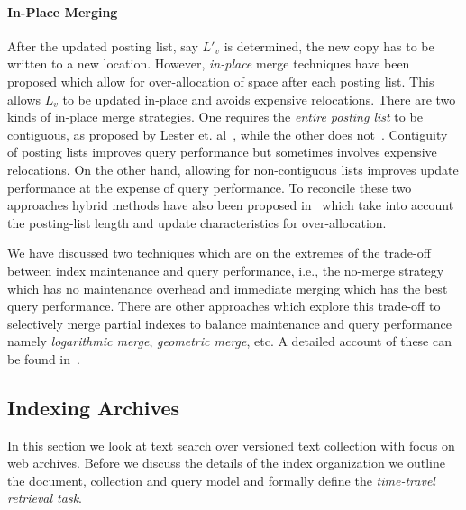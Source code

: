 \paragraph{In-Place Merging}
After the updated posting list, say $L'_v$ is determined, the new copy has to be written to a new location. However, \emph{in-place} merge techniques have been proposed which allow for over-allocation of space after each posting list. This allows $L_v$ to be updated in-place and avoids expensive relocations. There are two kinds of in-place merge strategies. One requires the \emph{entire posting list} to be contiguous, as proposed by Lester et. al~\cite{lester2006efficient}, while the other does not~\cite{tomasic1994incremental}. Contiguity of posting lists improves query performance but sometimes involves expensive relocations. On the other hand, allowing for non-contiguous lists improves update performance at the expense of query performance. To reconcile these two approaches hybrid methods have also been proposed in~\cite{buttcher2006hybrid} which take into account the posting-list length and update characteristics for over-allocation. 

We have discussed two techniques which are on the extremes of the trade-off between index maintenance and query performance, i.e., the no-merge strategy which has no maintenance overhead and immediate merging which has the best query performance. There are other approaches which explore this trade-off to selectively merge partial indexes to balance maintenance and query performance namely \emph{logarithmic merge}, \emph{geometric merge}, etc. A detailed account of these can be found in~\cite{Buttcher:2010fk}.

\subsection{Indexing Archives}
In this section we look at text search over versioned text collection with focus on web archives. Before we discuss the details of the index organization we outline the document, collection and query model and formally define the \emph{time-travel retrieval task}. 

\label{chap:foundations:sec:model}
